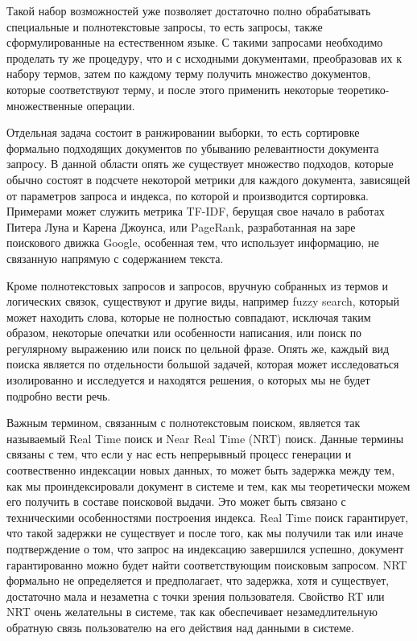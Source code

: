 Такой набор возможностей уже позволяет достаточно полно обрабатывать специальные и полнотекстовые запросы, то есть запросы, также сформулированные на естественном языке. С такими запросами необходимо проделать ту же процедуру, что и с исходными документами, преобразовав их к набору термов, затем по каждому терму получить множество документов, которые соответствуют терму, и после этого применить некоторые теоретико-множественные операции.

Отдельная задача состоит в ранжировании выборки, то есть сортировке формально подходящих документов по убыванию релевантности документа запросу. В данной области опять же существует множество подходов, которые обычно состоят в подсчете некоторой метрики для каждого документа, зависящей от параметров запроса и индекса, по которой и производится сортировка. Примерами может служить метрика TF-IDF, берущая свое начало в работах Питера Луна\cite{luhn} и Карена Джоунса\cite{jones}, или PageRank\cite{google}, разработанная на заре поискового движка Google, особенная тем, что использует информацию, не связанную напрямую с содержанием текста.

Кроме полнотекстовых запросов и запросов, вручную собранных из термов и логических связок, существуют и другие виды, например fuzzy search, который может находить слова, которые не полностью совпадают, исключая таким образом, некоторые опечатки или особенности написания, или поиск по регулярному выражению или поиск по цельной фразе. Опять же, каждый вид поиска является по отдельности большой задачей, которая может исследоваться изолированно и исследуется и находятся решения, о которых мы не будет подробно вести речь.

Важным термином, связанным с полнотекстовым поиском, является так называемый Real Time поиск и Near Real Time (NRT) поиск. Данные термины связаны с тем, что если у нас есть непрерывный процесс генерации и соотвественно индексации новых данных, то может быть задержка между тем, как мы проиндексировали документ в системе и тем, как мы теоретически можем его получить в составе поисковой выдачи. Это может быть связано с техническими особенностями построения индекса. Real Time поиск гарантирует, что такой задержки не существует и после того, как мы получили так или иначе подтверждение о том, что запрос на индексацию завершился успешно, документ гарантированно можно будет найти соответствующим поисковым запросом. NRT формально не определяется и предполагает, что задержка, хотя и существует, достаточно мала и незаметна с точки зрения пользователя. Свойство RT или NRT очень желательны в системе, так как обеспечивает незамедлительную обратную связь пользователю на его действия над данными в системе.

